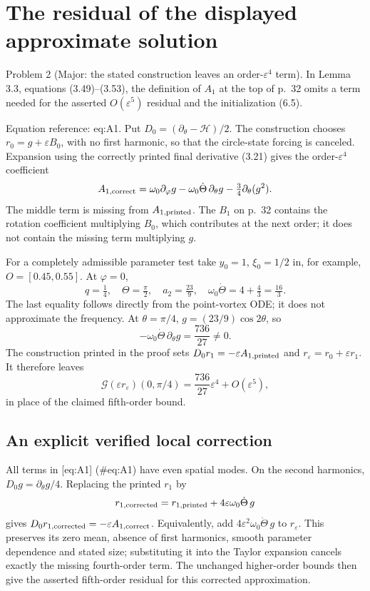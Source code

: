 \documentclass[10pt]{article}
\begin{document}
\section*{The residual of the displayed approximate solution}
Problem 2 (Major: the stated construction leaves an order-\(\varepsilon^4\) term).  In Lemma 3.3, equations (3.49)–(3.53), the definition of \(A_1\) at the top of p. 32 omits a term needed for the asserted \(O(\varepsilon^5)\) residual and the initialization (6.5).\par
Equation reference: eq:A1. Put \(D_0=(\partial_\theta-\mathcal H)/2\). The construction chooses \(r_0=g+\varepsilon B_0\), with no first harmonic, so that the circle-state forcing is canceled. Expansion using the correctly printed final derivative (3.21) gives the order-\(\varepsilon^4\) coefficient \[
 A_{1,\rm correct}
  =\omega_0\partial_\varphi g
     -\omega_0\dot\Theta\,\partial_\theta g
     -\tfrac34\partial_\theta(g^2).\] The middle term is missing from \(A_{1,\rm printed}\). The \(B_1\) on p. 32 contains the rotation coefficient multiplying \(B_0\), which contributes at the next order; it does not contain the missing term multiplying \(g\).\par
For a completely admissible parameter test take \(y_0=1\), \(\xi_0=1/2\) in, for example, \(O=[0.45,0.55]\). At \(\varphi=0\), \[q=\tfrac14,\quad \Theta=\tfrac\pi2,\quad
 a_2=\tfrac{23}{9},\quad
 \omega_0\dot\Theta=4+\tfrac43=\tfrac{16}{3}.\] The last equality follows directly from the point-vortex ODE; it does not approximate the frequency. At \(\theta=\pi/4\), \(g=(23/9)\cos2\theta\), so \[-\omega_0\dot\Theta\,\partial_\theta g
       =\frac{736}{27}\ne0.\] The construction printed in the proof sets \(D_0r_1=-\varepsilon A_{1,\rm printed}\) and \(r_\varepsilon=r_0+\varepsilon r_1\). It therefore leaves \[\mathcal G(\varepsilon r_\varepsilon)(0,\pi/4)
       =\frac{736}{27}\varepsilon^4+O(\varepsilon^5),\] in place of the claimed fifth-order bound.\par
\subsection*{An explicit verified local correction}
All terms in [eq:A1] (\#eq:A1) have even spatial modes. On the second harmonics, \(D_0g=\partial_\theta g/4\). Replacing the printed \(r_1\) by \[r_{1,\rm corrected}
      =r_{1,\rm printed}+4\varepsilon\omega_0\dot\Theta\,g\] gives \(D_0r_{1,\rm corrected}=-\varepsilon A_{1,\rm correct}\). Equivalently, add \(4\varepsilon^2\omega_0\dot\Theta\,g\) to \(r_\varepsilon\). This preserves its zero mean, absence of first harmonics, smooth parameter dependence and stated size; substituting it into the Taylor expansion cancels exactly the missing fourth-order term. The unchanged higher-order bounds then give the asserted fifth-order residual for this corrected approximation.\par
\end{document}

